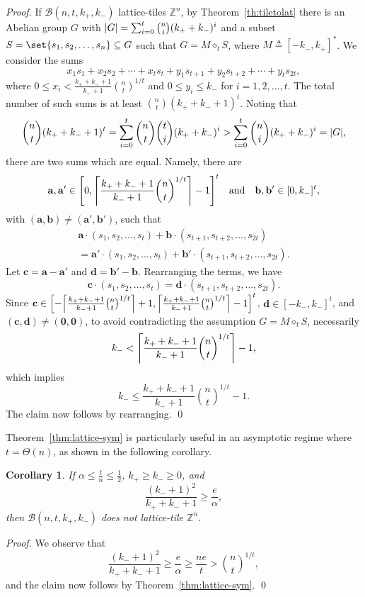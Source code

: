 \documentclass[sort&compress]{elsarticle}
\DeclarePairedDelimiter\abs{\lvert}{\rvert}
\DeclarePairedDelimiter\ceil{\lceil}{\rceil}
\DeclarePairedDelimiter\sparenv{\lbrack}{\rbrack}
\renewcommand{\leq}{\leqslant}
\renewcommand{\geq}{\geqslant}
\newtheorem{corollary}{Corollary}
\newcommand{\Z}{\mathbb{Z}}
\newcommand{\va}{\mathbf{a}}
\newcommand{\vb}{\mathbf{b}}
\newcommand{\vc}{\mathbf{c}}
\newcommand{\vd}{\mathbf{d}}
\newcommand{\Zero}{{\mathbf{0}}}
\newcommand{\kp}{k_+}
\newcommand{\km}{k_-}
\newcommand{\BALL}{{\mathcal B}(n,t,\kp,\km)}
\newcommand{\eqdef}{\triangleq}
\newcommand{\splt}{\diamond}
\begin{document}
\begin{proof}
  If $\BALL$ lattice-tiles $\Z^n$, by Theorem~\ref{th:tiletolat} there
  is an Abelian group $G$ with $\abs{G}= \sum_{i=0}^t \binom{n}{i}
  (\kp+\km)^i$ and a subset $S=\set{s_1,s_2,\ldots, s_n} \subseteq G$
  such that $G=M\splt_t S$, where $M\eqdef[-\km,\kp]^*$. We consider
  the sums
  \[x_1s_1+x_2s_2+\cdots + x_t s_t+y_1s_{t+1}+y_2s_{t+2} +\cdots + y_t s_{2t},\]
  where $0\leq x_i < \frac{\kp+\km+1}{\km+1} \binom{n}{t}^{1/t}$ and
  $0\leq y_i \leq \km$ for $i=1,2,\ldots, t$. The total number of such
  sums is at least $\binom{n}{t}(\kp+\km+1)^t$.  Noting that
  \[\binom{n}{t}(\kp+\km+1)^t =  \sum_{i=0}^t \binom{n}{t}\binom{t}{i} (\kp+\km)^i  > \sum_{i=0}^t \binom{n}{i} (\kp+\km)^i=\abs{G},\]
  there are two sums which are equal. Namely, there are
  \[\va, \va'\in \sparenv*{0, \ceil*{\frac{\kp+\km+1}{\km+1} \binom{n}{t}^{1/t}}-1}^t
  \quad\text{and}\quad \vb,\vb'\in [0,\km]^t,\]
  with $(\va,\vb)\neq (\va',\vb')$, such that
  \begin{multline*}
    \va \cdot (s_1,s_2,\ldots, s_t)+\vb \cdot(s_{t+1},s_{t+2}, \ldots, s_{2t})\\
    = \va' \cdot (s_1,s_2,\ldots, s_t)+\vb' \cdot(s_{t+1},s_{t+2}, \ldots, s_{2t}).
  \end{multline*}
  Let $\vc=\va-\va'$ and $\vd=\vb'-\vb$. Rearranging the terms, we have 
  \[\vc \cdot (s_1,s_2,\ldots, s_t)=\vd \cdot(s_{t+1},s_{t+2}, \ldots, s_{2t}).\] 
  Since $\vc \in \sparenv*{- \ceil*{\frac{\kp+\km+1}{\km+1}
      \binom{n}{t}^{1/t}}+1, \ceil*{\frac{\kp+\km+1}{\km+1}
      \binom{n}{t}^{1/t}}-1}^t$, $\vd\in [-\km,\km]^t$, and
  $(\vc,\vd)\neq(\Zero,\Zero)$, to avoid contradicting the assumption
  $G=M\splt_t S$, necessarily
  \[\km< \ceil*{\frac{\kp+\km+1}{\km+1} \binom{n}{t}^{1/t}}-1,\]
which implies
  \[\km \leq \frac{\kp+\km+1}{\km+1} \binom{n}{t}^{1/t}-1.\]
  The claim now follows by rearranging.
  \qed\end{proof}

  Theorem~\ref{thm:lattice-sym} is particularly useful in an
  asymptotic regime where $t=\Theta(n)$, as shown in the following
  corollary.

  \begin{corollary}
    If $\alpha \leq \frac{t}{n} \leq \frac{1}{2}$, $\kp\geq\km\geq 0$, and
    \[ \frac{(\km+1)^2}{\kp+\km+1} \geq \frac{e}{\alpha},\]
    then $\BALL$ does not lattice-tile $\Z^n$.
  \end{corollary}

  \begin{proof}
    We observe that
    \[
    \frac{(\km+1)^2}{\kp+\km+1} \geq \frac{e}{\alpha}
    \geq \frac{ne}{t}>\binom{n}{t}^{1/t},\]
    and the claim now follows by Theorem~\ref{thm:lattice-sym}.
\qed\end{proof}
\end{document}
